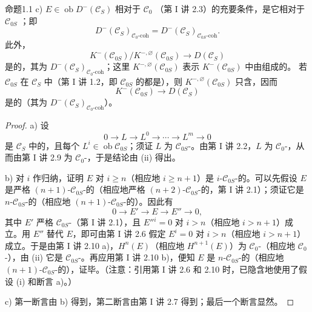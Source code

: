 \begin{SGAresult}{命题}{1.1}
c) $E\in\operatorname{ob}D^-(\mathcal C_S)$ 相对于 $\mathcal C_0$ （第 I 讲 2.3）的充要条件，是它相对于 $\mathcal C_{0S}$ ；即
\[
D^-(\mathcal C_S)_{\mathcal C_0\text{-coh}}=D^-(\mathcal C_S)_{\mathcal C_{0S}\text{-coh}}.
\]
此外，
\[
K^-(\mathcal C_{0S})/K^{-,\varnothing}(\mathcal C_{0S})\longrightarrow D(\mathcal C_S)
\]
是的，其为 $D^-(\mathcal C_S)_{\mathcal C_0\text{-coh}}$；这里 $K^{-,\varnothing}(\mathcal C_{0S})$ 表示 $K^-(\mathcal C_{0S})$ 中由组成的。
若 $\mathcal C_{0S}$ 在 $\mathcal C_S$ 中（第 I 讲 1.2，即 $\mathcal C_{0S}$ 的都是），则 $K^{-,\varnothing}(\mathcal C_{0S})$ 只含，因而
\[
K^-(\mathcal C_{0S})\longrightarrow D(\mathcal C_S)
\]
是的（其为 $D^-(\mathcal C_S)_{\mathcal C_0\text{-coh}}$）。
\end{SGAresult}
\begin{proof}
a) 设
\[
0\longrightarrow L\longrightarrow L^0\longrightarrow\cdots\longrightarrow L^m\longrightarrow0
\]
是 $\mathcal C_S$ 中的，且每个 $L^i\in\operatorname{ob}\mathcal C_{0S}$；须证 $L$ 为 $\mathcal C_{0S}$-。由第 I 讲 2.2，$L$ 为 $\mathcal C_0$-，从而由第 I 讲 2.9 为 $\mathcal C_0$-，于是结论由 (ii) 得出。

b) 对 $i$ 作归纳，证明 $E$ 对 $i\geq n$（相应地 $i\geq n+1$）是 $i$-$\mathcal C_{0S}$-的。可以先假设 $E$ 是严格 $(n+1)$-$\mathcal C_{0S}$-的（相应地严格 $(n+2)$-$\mathcal C_{0S}$-的，第 I 讲 2.1）；须证它是 $n$-$\mathcal C_{0S}$-的（相应地 $(n+1)$-$\mathcal C_{0S}$-的）。因此有
\[
0\longrightarrow E'\longrightarrow E\longrightarrow E''\longrightarrow0,
\]
其中 $E'$ 严格 $\mathcal C_{0S}$-（第 I 讲 2.1），且 $E''{}^i=0$ 对 $i>n$（相应地 $i>n+1$）成立。用 $E''$ 替代 $E$，即可由第 I 讲 2.6 假定 $E^i=0$ 对 $i>n$（相应地 $i>n+1$）成立。于是由第 I 讲 2.10 a)，$H^n(E)$（相应地 $H^{n+1}(E)$）为 $\mathcal C_0$-（相应地 $\mathcal C_0$-），由 (ii) 它是 $\mathcal C_{0S}$-。再应用第 I 讲 2.10 b)，便知 $E$ 是 $n$-$\mathcal C_{0S}$-的（相应地 $(n+1)$-$\mathcal C_{0S}$-的），证毕。（注意：引用第 I 讲 2.6 和 2.10 时，已隐含地使用了假设 (i) 和断言 a)。）

c) 第一断言由 b) 得到，第二断言由第 I 讲 2.7 得到；最后一个断言显然。
\end{proof}

